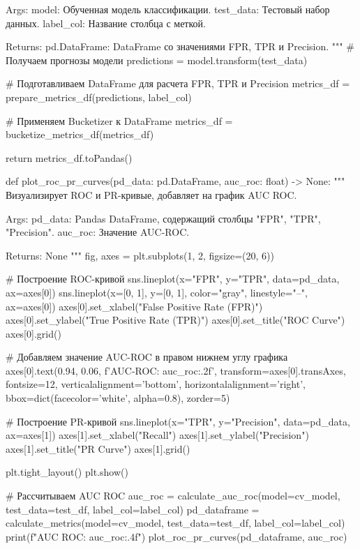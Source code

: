 \begin{code}
    Args:
        model: Обученная модель классификации.
        test_data: Тестовый набор данных.
        label_col: Название столбца с меткой.

    Returns:
        pd.DataFrame: DataFrame со значениями FPR, TPR и Precision.
    """
    # Получаем прогнозы модели
    predictions = model.transform(test_data)

    # Подготавливаем DataFrame для расчета FPR, TPR и Precision
    metrics_df = prepare_metrics_df(predictions, label_col)

    # Применяем Bucketizer к DataFrame
    metrics_df = bucketize_metrics_df(metrics_df)

    return metrics_df.toPandas()

def plot_roc_pr_curves(pd_data: pd.DataFrame,
                       auc_roc: float) -> None:
    """
    Визуализирует ROC и PR-кривые, добавляет на график AUC ROC.

    Args:
        pd_data: Pandas DataFrame, содержащий столбцы "FPR", "TPR", "Precision".
        auc_roc: Значение AUC-ROC.

    Returns:
        None
    """
    fig, axes = plt.subplots(1, 2, figsize=(20, 6))

    # Построение ROC-кривой
    sns.lineplot(x="FPR", y="TPR", data=pd_data, ax=axes[0])
    sns.lineplot(x=[0, 1], y=[0, 1],
                 color="gray", linestyle="--", ax=axes[0])
    axes[0].set_xlabel("False Positive Rate (FPR)")
    axes[0].set_ylabel("True Positive Rate (TPR)")
    axes[0].set_title("ROC Curve")
    axes[0].grid()

    # Добавляем значение AUC-ROC в правом нижнем углу графика
    axes[0].text(0.94, 0.06, f'AUC-ROC: {auc_roc:.2f}',
                 transform=axes[0].transAxes,
                 fontsize=12, verticalalignment='bottom',
                 horizontalalignment='right',
                 bbox=dict(facecolor='white', alpha=0.8), zorder=5)

    # Построение PR-кривой
    sns.lineplot(x="TPR", y="Precision", data=pd_data, ax=axes[1])
    axes[1].set_xlabel("Recall")
    axes[1].set_ylabel("Precision")
    axes[1].set_title("PR Curve")
    axes[1].grid()

    plt.tight_layout()
    plt.show()

# Рассчитываем AUC ROC
auc_roc = calculate_auc_roc(model=cv_model,
                            test_data=test_df,
                            label_col=label_col)
pd_dataframe = calculate_metrics(model=cv_model,
                                 test_data=test_df,
                                 label_col=label_col)
print(f"AUC ROC: {auc_roc:.4f}")
plot_roc_pr_curves(pd_dataframe, auc_roc)


\end{code}
